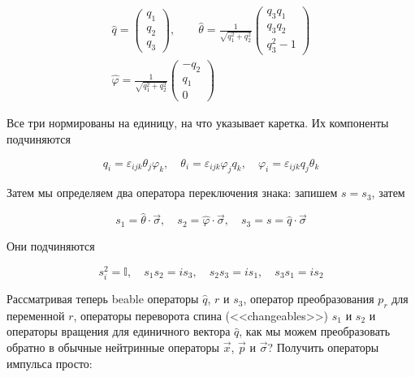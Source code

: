 \documentclass[main.tex]{subfiles}
\begin{document}
\begin{equation}\label{15.29}
	\begin{array}{l}{\hat{q}=\left(\begin{array}{l}{q_{1}} \\ {q_{2}} \\ {q_{3}}\end{array}\right), \quad \quad \hat{\theta}=\frac{1}{\sqrt{q_{1}^{2}+q_{2}^{2}}}\left(\begin{array}{c}{q_{3} q_{1}} \\ {q_{3} q_{2}} \\ {q_{3}^{2}-1}\end{array}\right)} \\ {\hat{\varphi}=\frac{1}{\sqrt{q_{1}^{2}+q_{2}^{2}}}\left(\begin{array}{c}{-q_{2}} \\ {q_{1}} \\ {0}\end{array}\right)}\end{array}
\end{equation}

Все три нормированы на единицу, на что указывает каретка. Их компоненты подчиняются

\begin{equation}\label{15.30}
	q_{i}=\varepsilon_{i j k} \theta_{j} \varphi_{k}, \quad \theta_{i}=\varepsilon_{i j k} \varphi_{j} q_{k}, \quad \varphi_{i}=\varepsilon_{i j k} q_{j} \theta_{k}
\end{equation}

Затем мы определяем два оператора переключения знака: запишем $s = s_3$, затем

\begin{equation}\label{15.31}
	s_{1}=\hat{\theta} \cdot \vec{\sigma}, \quad s_{2}=\hat{\varphi} \cdot \vec{\sigma}, \quad s_{3}=s=\hat{q} \cdot \vec{\sigma}
\end{equation}

Они подчиняются

\begin{equation}\label{15.32}
	s_{i}^{2}=\mathbb{I}, \quad s_{1} s_{2}=i s_{3}, \quad s_{2} s_{3}=i s_{1}, \quad s_{3} s_{1}=i s_{2}
\end{equation}
                          
Рассматривая теперь beable операторы $\hat q$, $r$ и $s_3$, оператор преобразования $p_r$ для переменной $r$, операторы переворота спина (<<changeables>>) $s_1$ и $s_2$ и операторы вращения для единичного вектора $\hat q$, как мы можем преобразовать обратно в обычные нейтринные операторы $\vec x$, $\vec p$ и $\vec \sigma$?
Получить операторы импульса просто:
\end{document}
